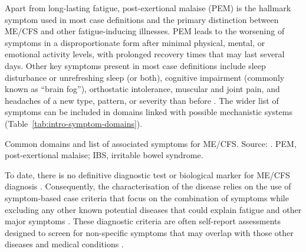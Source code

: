 Apart from long-lasting fatigue, post-exertional malaise (PEM) is the hallmark symptom used in most case definitions and the primary distinction between ME/CFS and other fatigue-inducing illnesses. PEM leads to the worsening of symptoms in a disproportionate form after minimal physical, mental, or emotional activity levels, with prolonged recovery times that may last several days. Other key symptoms present in most case definitions include sleep disturbance or unrefreshing sleep (or both), cognitive impairment (commonly known as ``brain fog''), orthostatic intolerance, muscular and joint pain, and headaches of a new type, pattern, or severity than before \citep{lim2020SystematicReviewa}. The wider list of symptoms can be included in domains linked with possible mechanistic systems (Table~\ref{tab:intro-symptom-domains}).

\begin{table}[htbp]
    \centering
    \caption[Common domains and list of associated symptoms for ME/CFS]{Common domains and list of associated symptoms for ME/CFS. Source: \citet{carruthers2003MyalgicEncephalomyelitis, instituteofmedicine2015MyalgicEncephalomyelitis, lacerda2017UKME}. PEM, post-exertional malaise; IBS, irritable bowel syndrome.}
    \resizebox{\textwidth}{!}{}
    \label{tab:intro-symptom-domains}
\end{table}

To date, there is no definitive diagnostic test or biological marker for ME/CFS diagnosis \citep{scheibenbogen2017EuropeanME}.
Consequently, the characterisation of the disease relies on the use of symptom-based case criteria that focus on the combination of symptoms while excluding any other known potential diseases that could explain fatigue and other major symptoms \citep{smith2014DiagnosisTreatment, instituteofmedicine2015MyalgicEncephalomyelitis}.
These diagnostic criteria are often self-report assessments designed to screen for non-specific symptoms that may overlap with those other diseases and medical conditions \citep{brurberg2014CaseDefinitions}.

